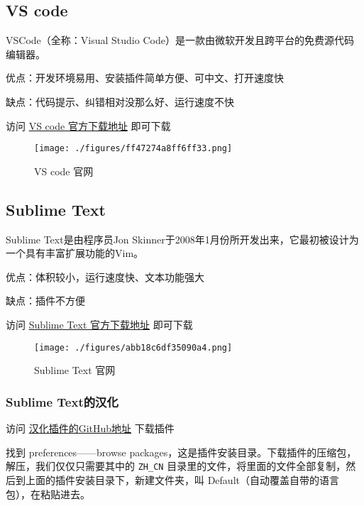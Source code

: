 
\begin{issues}
\issueTODO
\end{issues}

\subsection{VS code}

VSCode（全称：Visual Studio Code）是一款由微软开发且跨平台的免费源代码编辑器。

优点：开发环境易用、安装插件简单方便、可中文、打开速度快

缺点：代码提示、纠错相对没那么好、运行速度不快

访问 \href{https://code.visualstudio.com/}{VS code 官方下载地址} 即可下载

\begin{figure}[ht]
\centering
\texttt{[image: ./figures/ff47274a8ff6ff33.png]}
\caption{VS code 官网} \label{fig_Code_1}
\end{figure}

\subsection{Sublime Text}

Sublime Text是由程序员Jon Skinner于2008年1月份所开发出来，它最初被设计为一个具有丰富扩展功能的Vim。

优点：体积较小，运行速度快、文本功能强大

缺点：插件不方便

访问 \href{https://www.sublimetext.com/}{Sublime Text 官方下载地址} 即可下载

\begin{figure}[ht]
\centering
\texttt{[image: ./figures/abb18c6df35090a4.png]}
\caption{Sublime Text 官网} \label{fig_Code_2}
\end{figure}

\subsubsection{Sublime Text的汉化}

访问 \href{https://github.com/rexdf/ChineseLocalization}{汉化插件的GitHub地址} 下载插件

找到 preferences——browse packages，这是插件安装目录。下载插件的压缩包，解压，我们仅仅只需要其中的 \verb`ZH_CN` 目录里的文件，将里面的文件全部复制，然后到上面的插件安装目录下，新建文件夹，叫 Default（自动覆盖自带的语言包），在粘贴进去。



